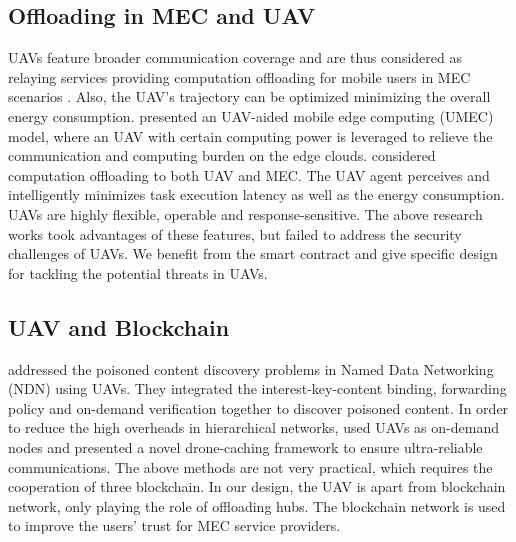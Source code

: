\subsection{Offloading in MEC and UAV}
UAVs feature broader communication coverage and are thus considered as relaying services providing computation offloading for mobile users in MEC scenarios \cite{jeong2017mobile}.
Also, the UAV's trajectory can be optimized minimizing the overall energy consumption.
\cite{zhou2018uav} presented an UAV-aided mobile edge computing (UMEC) model, where an UAV with certain computing power is leveraged to relieve the communication and computing burden on the edge clouds.
\cite{wang2020agent} considered computation offloading to both UAV and MEC. 
The UAV agent perceives and intelligently minimizes task execution latency as well as the energy consumption.
UAVs are highly flexible, operable and response-sensitive. The above research works took advantages of these features, but failed to address the security challenges of UAVs.
We benefit from the smart contract and give specific design for tackling the potential threats in UAVs.

\subsection{UAV and Blockchain}
\cite{lei2019securing} addressed the poisoned content discovery problems in Named Data Networking (NDN) using UAVs. They integrated the interest-key-content binding, forwarding policy and on-demand verification together to discover poisoned content.
In order to reduce the high overheads in hierarchical networks, \cite{sharma2019neural} used UAVs as on-demand nodes and presented a novel 
drone-caching framework to ensure ultra-reliable communications.
The above methods are not very practical, which requires the cooperation of three blockchain. In our design, the UAV is apart from blockchain network, only playing the role of offloading hubs. The blockchain network is used to improve the users' trust for MEC service providers.